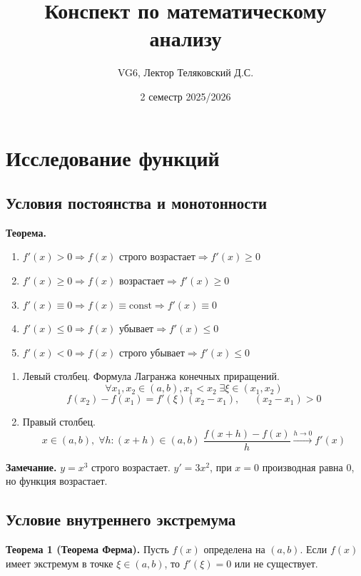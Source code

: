 \documentclass[12pt, a4paper]{article}
\title{Конспект по математическому анализу}
\author{VG6, Лектор Теляковский Д.С.}
\date{2 семестр 2025/2026}
\begin{document}
\maketitle
\tableofcontents
\newpage

\section{Исследование функций}
\subsection{Условия постоянства и монотонности}

\textbf{Теорема.}
\begin{tcolorbox}
	\begin{enumerate}
		\item $f'(x) > 0 \Rightarrow f(x) \text{ строго возрастает} \Rightarrow f'(x) \geq 0$ 
		\item $f'(x) \geq 0 \Rightarrow f(x) \text{ возрастает} \Rightarrow f'(x) \geq 0$ 
		\item $f'(x) \equiv 0 \Rightarrow f(x) \equiv \text{const} \Rightarrow f'(x) \equiv 0$ 
		\item $f'(x) \leq 0 \Rightarrow f(x) \text{ убывает} \Rightarrow f'(x) \leq 0$ 
		\item $f'(x) < 0 \Rightarrow f(x) \text{ строго убывает} \Rightarrow f'(x) \leq 0$ 
	\end{enumerate}
\end{tcolorbox}
\begin{tcolorbox}[title=Доказательство]
	\begin{enumerate}
		\item Левый столбец. Формула Лагранжа конечных приращений. 
			\[ \forall x_1, x_2 \in (a, b), x_1 < x_2\; \exists \xi \in (x_1, x_2) \]
		\[ f(x_2) - f(x_1) = f'(\xi) (x_2 - x_1), \;\;\;\;\; (x_2 - x_1) > 0 \]
	\item Правый столбец. 
		\[ x \in (a, b),\; \forall h: (x+h) \in (a, b)\;\frac{f(x+h) - f(x)}{h} \xrightarrow[]{h\to 0} f'(x)\]
	\end{enumerate}
\end{tcolorbox}

\textbf{Замечание.} $y = x^3$ строго возрастает. 
$y' = 3x^2$, при $x = 0$ производная равна 0, но функция возрастает.

\subsection{Условие внутреннего экстремума}
\textbf{Теорема 1 (Теорема Ферма).} Пусть $f(x)$ определена на $(a, b)$. Если $f(x)$ имеет экстремум в точке $\xi \in (a, b)$, то $f'(\xi) = 0$ или не существует. 
\end{document}
